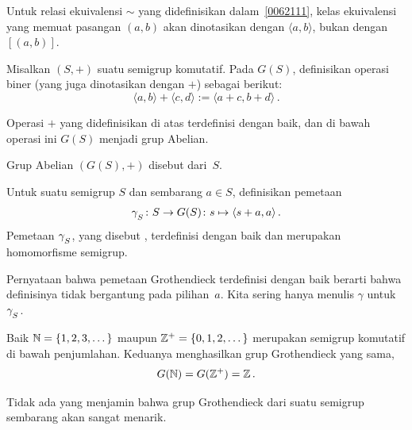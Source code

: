 \begin{notn} Untuk relasi ekuivalensi $\sim$ yang didefinisikan dalam~\ref{0062111}, kelas ekuivalensi
yang memuat pasangan $(a,b)$ akan dinotasikan dengan %
$\langle a,b \rangle$, bukan dengan~$[(a,b)]$.
\end{notn}

\begin{defn} Misalkan $(S,+)$ suatu semigrup komutatif. Pada $G(S)$, definisikan operasi biner
(yang juga dinotasikan dengan $+$) sebagai berikut:
  \[ \langle a,b \rangle + \langle c,d \rangle := \langle a + c,b + d\rangle\,. \]
\end{defn}

\begin{prop}\label{0062119} Operasi $+$ yang didefinisikan di atas terdefinisi dengan baik, dan di bawah
operasi ini $G(S)$ menjadi grup Abelian. %
\end{prop}

Grup Abelian $(G(S),+)$ disebut
 dari~$S$.

\begin{prop}\label{0062124} Untuk suatu semigrup $S$ dan sembarang $a \in S$, definisikan
pemetaan
   \[ \gamma_{{}_{\scriptstyle{S}}} \colon S \rightarrow G(S) \colon s \mapsto \langle s + a, a \rangle\,. \]
Pemetaan $\gamma_{{}_{\scriptstyle{S}}}$, yang disebut
, terdefinisi dengan baik dan merupakan homomorfisme semigrup.
\end{prop}

Pernyataan bahwa pemetaan Grothendieck terdefinisi dengan baik berarti bahwa definisinya tidak bergantung
pada pilihan~$a$. Kita sering hanya menulis $\gamma$ untuk~$\gamma_{{}_{\scriptstyle{S}}}$.

\begin{exam}\label{0062126} Baik $\mathbb{N} = \{1,2,3,\dots\}$ maupun $\mathbb{Z}^+ = \{0,1,2,\dots\}$ merupakan
semigrup komutatif di bawah penjumlahan. Keduanya menghasilkan grup Grothendieck yang sama,
   \[G(\mathbb{N}) = G(\mathbb{Z}^+) = \mathbb{Z}\,. \]
\end{exam}

Tidak ada yang menjamin bahwa grup Grothendieck dari suatu semigrup sembarang akan sangat menarik.

